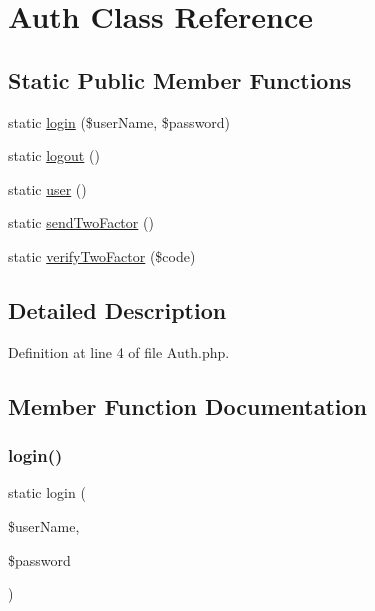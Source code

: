 \hypertarget{class_auth}{}\section{Auth Class Reference}
\label{class_auth}
\subsection*{Static Public Member Functions}
\begin{DoxyCompactItemize}
\item 
static \hyperlink{class_auth_a5b58b727794a21b87e23d646eb9ddc6d}{login} (\$user\+Name, \$password)
\item 
static \hyperlink{class_auth_a1e34160e903835a43123f538e93457a2}{logout} ()
\item 
static \hyperlink{class_auth_a7949f68385a98a60ff42ea3c3a768ec7}{user} ()
\item 
static \hyperlink{class_auth_a630afde0cf1e1c509b51e8686c8312ac}{send\+Two\+Factor} ()
\item 
static \hyperlink{class_auth_a44cd32430eda0860d3d5a4e4a210a106}{verify\+Two\+Factor} (\$code)
\end{DoxyCompactItemize}


\subsection{Detailed Description}


Definition at line 4 of file Auth.\+php.



\subsection{Member Function Documentation}
\hypertarget{class_auth_a5b58b727794a21b87e23d646eb9ddc6d}{}\label{class_auth_a5b58b727794a21b87e23d646eb9ddc6d} 
\subsubsection{\texorpdfstring{login()}{login()}}
{\footnotesize\ttfamily static login (\begin{DoxyParamCaption}\item[{}]{\$user\+Name,  }\item[{}]{\$password }\end{DoxyParamCaption})\hspace{0.3cm}{\ttfamily [static]}}


